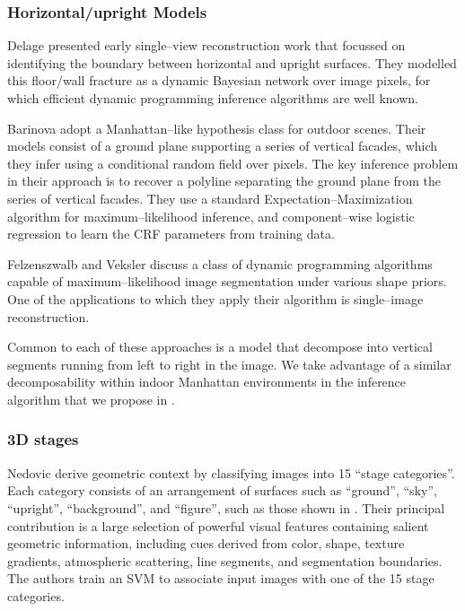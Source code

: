 \subsubsection{Horizontal/upright Models}

Delage \etal \cite{Delage2006} presented early single--view
reconstruction work that focussed on identifying the boundary between
horizontal and upright surfaces. They modelled this floor/wall
fracture as a dynamic Bayesian network over image pixels, for which
efficient dynamic programming inference algorithms are well known.

Barinova \etal \cite{Barinova08} adopt a Manhattan--like hypothesis
class for outdoor scenes. Their models consist of a ground plane
supporting a series of vertical facades, which they infer using a
conditional random field over pixels. The key inference problem in
their approach is to recover a polyline separating the ground plane
from the series of vertical facades. They use a standard
Expectation--Maximization algorithm for maximum--likelihood inference,
and component--wise logistic regression to learn the CRF parameters
from training data.

Felzenszwalb and Veksler \cite{Felzenszwalb10} discuss a class of
dynamic programming algorithms capable of maximum--likelihood
image segmentation under various shape priors. One of the applications
to which they apply their algorithm is single--image reconstruction.

Common to each of these approaches is a model that decompose into
vertical segments running from left to right in the image. We take
advantage of a similar decomposability within indoor Manhattan
environments in the inference algorithm that we propose in
.

\subsubsection{3D stages}

Nedovic \etal \cite{Nedovic2010} derive geometric context by
classifying images into 15 ``stage categories''. Each category
consists of an arrangement of surfaces such as ``ground'', ``sky'',
``upright'', ``background'', and ``figure'', such as those shown in
. Their principal contribution is a large
selection of powerful visual features containing salient geometric
information, including cues derived from color, shape, texture
gradients, atmospheric scattering, line segments, and segmentation
boundaries. The authors train an SVM to associate input images with
one of the 15 stage categories.\changedsinceviva

